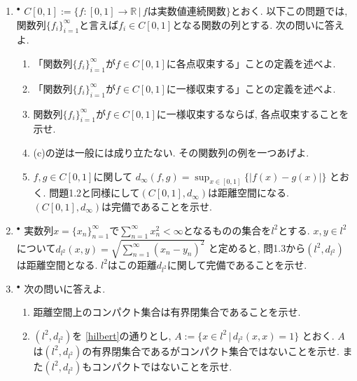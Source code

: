 \documentclass[dvipdfmx,a4paper,11pt]{article}
\newcommand{\R}{\mathbb{R}}
\theoremstyle{definition}
\begin{document}
\begin{enumerate}[label=\textbf{問}10.\arabic*]



\item \label{uniform} $^{\bullet}$  $C[0,1] := \{ f : [0,1] \rightarrow \R \,|\, \text{$f$は実数値連続関数}\}$とおく. 以下この問題では, 関数列$\{ f_{i}\}_{i=1}^{\infty}$と言えば$f_i \in C[0,1]$となる関数の列とする. 次の問いに答えよ.
\begin{enumerate}
\setlength{\parskip}{0cm}
  \setlength{\itemsep}{2pt} 
\item 「関数列$\{ f_{i}\}_{i=1}^{\infty}$が$f \in C[0,1]$に各点収束する」ことの定義を述べよ.
\item 「関数列$\{ f_{i}\}_{i=1}^{\infty}$が$f \in C[0,1]$に一様収束する」ことの定義を述べよ. 
\item 関数列$\{ f_{i}\}_{i=1}^{\infty}$が$f \in C[0,1]$に一様収束するならば, 各点収束することを示せ. 
\item (c)の逆は一般には成り立たない. その関数列の例を一つあげよ.
\item $f,g \in C[0,1]$に関して
$
d_{\infty}(f,g)=\sup_{x \in [0,1] }\{ |f(x) - g(x)|\}
$
とおく. 問題1.2と同様にして$(C[0,1], d_{\infty})$は距離空間になる. 
$(C[0,1], d_{\infty})$は完備であることを示せ.
\end{enumerate}

\item \label{hilbert} $^{\bullet}$ 実数列$x = \{ x_n\}_{n=1}^{\infty}$で$\sum_{n=1}^{\infty} x_{n}^{2} < \infty$となるものの集合を$l^2$とする.
 $x,y \in l^2$について$d_{ l^2}(x,y) = \sqrt{ \sum_{n=1}^{\infty} (x_n- y_n)^2}$
 と定めると, 問1.3から$(l^2,d_{ l^2})$は距離空間となる. $l^2$はこの距離$d_{ l^2}$に関して完備であることを示せ.

\item $^{\bullet}$ 次の問いに答えよ.
	\begin{enumerate}
	\setlength{\parskip}{0cm}
  \setlength{\itemsep}{2pt} 
	\item 距離空間上のコンパクト集合は有界閉集合であることを示せ.
	\item $(l^2,d_{ l^2})$を \ref{hilbert}の通りとし, 
	$
	A := \{ x  \in  l^2 \,|\, d_{ l^2}(x,x)=1\}
	$
	とおく. $A$は$(l^2,d_{ l^2})$の有界閉集合であるがコンパクト集合ではないことを示せ. また$(l^2,d_{ l^2})$もコンパクトではないことを示せ.
	 \end{enumerate}




\end{enumerate}
\end{document}
